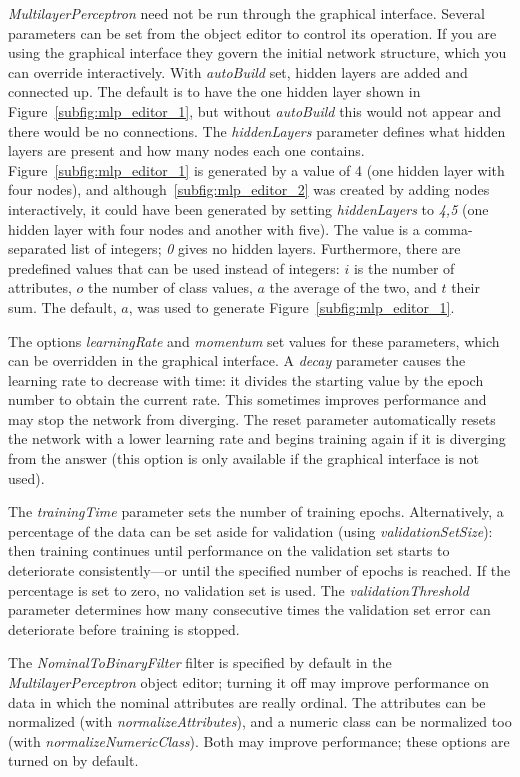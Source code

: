 \textit{MultilayerPerceptron} need not be run through the graphical
interface. Several parameters can be set from the object editor to
control its operation. If you are using the graphical interface they
govern the initial network structure, which you can override
interactively. With \textit{autoBuild} set, hidden layers are added
and connected up. The default is to have the one hidden layer shown in
Figure~\ref{subfig:mlp_editor_1}, but without \textit{autoBuild} this
would not appear and there would be no connections. The
\textit{hiddenLayers} parameter defines what hidden layers are present
and how many nodes each one contains. Figure~\ref{subfig:mlp_editor_1}
is generated by a value of 4 (one hidden layer with four nodes), and
although~\ref{subfig:mlp_editor_2} was created by adding nodes
interactively, it could have been generated by setting
\textit{hiddenLayers} to \textit{4,5} (one hidden layer with four
nodes and another with five). The value is a comma-separated list of
integers; \textit{0} gives no hidden layers. Furthermore, there are
predefined values that can be used instead of integers: $i$ is the
number of attributes, $o$ the number of class values, $a$ the average
of the two, and $t$ their sum. The default, $a$, was used to generate
Figure~\ref{subfig:mlp_editor_1}.

The options \textit{learningRate} and \textit{momentum} set values
for these parameters, which can be overridden in the graphical
interface. A \textit{decay} parameter causes the learning rate to
decrease with time: it divides the starting value by the epoch number
to obtain the current rate. This sometimes improves performance and
may stop the network from diverging. The reset parameter automatically
resets the network with a lower learning rate and begins training
again if it is diverging from the answer (this option is only
available if the graphical interface is not used).

The \textit{trainingTime} parameter sets the number of training
epochs. Alternatively, a percentage of the data can be set aside for
validation (using \textit{validationSetSize}): then training continues
until performance on the validation set starts to deteriorate
consistently---or until the specified number of epochs is reached. If
the percentage is set to zero, no validation set is used. The
\textit{validationThreshold} parameter determines how many consecutive
times the validation set error can deteriorate before training is
stopped.

The \textit{NominalToBinaryFilter} filter is specified by default in
the \textit{MultilayerPerceptron} object editor; turning it off may
improve performance on data in which the nominal attributes are really
ordinal. The attributes can be normalized (with
\textit{normalizeAttributes}), and a numeric class can be normalized
too (with \textit{normalizeNumericClass}). Both may improve
performance; these options are turned on by default.

